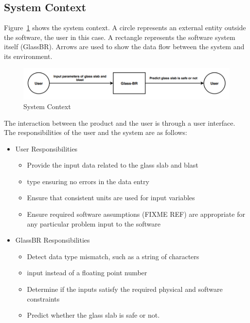\documentclass[12pt]{article}
\begin{document}
\subsection{System Context}
\label{Sec:SysContext}
Figure~\ref{Figure:sysCtxDiag} shows the system context. A circle represents an external entity outside the software, the user in this case. A rectangle represents the software system itself (GlassBR). Arrows are used to show the data flow between the system and its environment.
\begin{figure}
\begin{center}
\includegraphics[width=\textwidth]{../../../datafiles/GlassBR/SystemContextFigure.png}
\caption{System Context}
\label{Figure:sysCtxDiag}
\end{center}
\end{figure}
The interaction between the product and the user is through a user interface. The responsibilities of the user and the system are as follows:
\begin{itemize}
\item{User Responsibilities}
\begin{itemize}
\item{Provide the input data related to the glass slab and blast}
\item{type ensuring no errors in the data entry}
\item{Ensure that consistent units are used for input variables}
\item{Ensure required software assumptions (FIXME REF) are appropriate for any particular problem input to the software}
\end{itemize}
\item{GlassBR Responsibilities}
\begin{itemize}
\item{Detect data type mismatch, such as a string of characters}
\item{input instead of a floating point number}
\item{Determine if the inputs satisfy the required physical and software constraints}
\item{Predict whether the glass slab is safe or not.}
\end{itemize}
\end{itemize}
\end{document}

